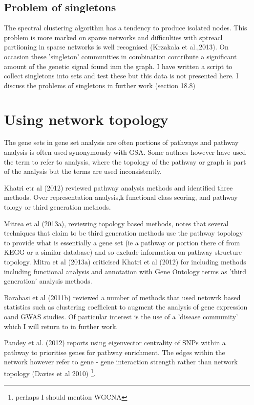 \subsection{Problem of singletons}

The spectral clustering algorithm has a tendency to produce isolated nodes. This problem is more marked on sparse networks and difficulties with sptreacl partiioning in sparse networks is well recognised (Krzakala et al.,2013). On occasion these 'singleton' communities in combination contribute a significant amount of the genetic signal found inm the graph. I have written a script to collect singletons into sets and test these but this data is not presented here. I discuss the problems of singletons in further work (section 18.8)

\section{Using network topology}

The gene sets in gene set analysis are often portions of pathways and pathway analysis is often used synonymously with GSA. Some authors however have used the term to refer to analysis, where the topology of the pathway or graph is part of the analysis but the terms are used inconsistently.

Khatri etr al (2012) reviewed pathway analysis methods and identified three methods. Over representation analysis,k functional class scoring, and pathway tology or third generation methods.

Mitrea et al (2013a), reviewing topology based methods, notes that several techniques that claim to be third generation methods use the pathway topology to provide what is essentially a gene set (ie a pathway or portion there of from KEGG or a similar database) and so exclude information on pathway structure topology. Mitra et al (2013a) criticised Khatri et al (2012) for including methods including functional analysis and annotation with Gene Ontology terms as 'third generation' analysis methods.

Barabasi et al (2011b) reviewed a number of methods that used netowrk based statistics such as clustering coefficient to augment the analysis of gene expression oand GWAS studies. Of particular interest is the use of a 'disease community' which I will return to in further work. 

Pandey et al. (2012) reports using eigenvector centrality of SNPs within a pathway to prioritise genes for pathway enrichment. The edges within the network however refer to gene - gene interaction strength rather than network topology (Davies et al 2010) \footnote{perhaps I should mention WGCNA}.

